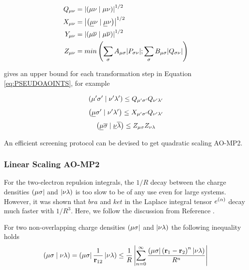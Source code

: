 \begin{equation}
\begin{split}
Q_{\mu\nu} &=  \abs{\left( \mu\nu \mid \mu\nu \right)}^{1/2} \\
X_{\mu\nu} &= \abs{\left( \underline{\mu}\nu \mid \underline{\mu}\nu \right)}^{1/2} \\
Y_{\mu\nu} &= \abs{\left( \mu\overline{\nu} \mid \mu\overline{\nu} \right)}^{1/2} \\
Z_{\mu\nu} &= min\left( \sum_{\sigma} A_{\mu\sigma} \abs{P_{\sigma\nu}}; \sum_{\sigma} B_{\mu \sigma} \abs{Q_{\sigma\nu}} \right)
\end{split}
\end{equation} 

\noindent gives an upper bound for each transformation step in Equation \ref{eq:PSEUDOAOINTS}, for example 

\begin{equation}
\left( \mu'\sigma' \mid \nu'\lambda' \right) \leq Q_{\mu'\sigma'}Q_{\nu'\lambda'}
\end{equation}
\begin{equation}
\left( \underline{\mu}\sigma' \mid \nu'\lambda' \right) \leq X_{\mu'\sigma'}Q_{\nu'\lambda'}
\end{equation}
\begin{equation}
\left( \underline{\mu} \overline{\sigma} \mid \underline{\nu}\overline{\lambda} \right) \leq Z_{\mu\sigma} Z_{\nu\lambda}
\end{equation}

\noindent An efficient screening protocol can be devised \cite{Has1993} to get quadratic scaling AO-MP2.

\subsubsection{Linear Scaling AO-MP2}

For the two-electron repulsion integrals, the $1/R$ decay between the charge densities $\left( \mu\sigma \right\rvert$ and $\left\lvert \nu\lambda \right)$ is too slow to be of any use even for large systems. However, it was shown \cite{Aya1999} that $bra$ and $ket$ in the Laplace integral tensor $e^{(\alpha)}$ decay much faster with $1/R^3$. Here, we follow the discussion from Reference \cite{Lam2005a}. 

For two non-overlapping charge densities $\left( \mu\sigma \right\rvert$ and $\left\lvert \nu\lambda \right)$ the following inequality holds
\begin{equation}
\left( \mu\sigma \mid \nu\lambda \right) = \left( \mu\sigma \right\rvert\frac{1}{\mathbf{r}_{12}}\left\lvert \nu\lambda \right) \leq \frac{1}{R} \left\lvert \sum_{n=0}^{\infty} \frac{\left( \mu\sigma \right\rvert \left( \mathbf{r}_1 - \mathbf{r}_2 \right)^n \left\lvert \nu\lambda \right)}{R^n} \right\rvert
\label{eq:MBIESCREEN}
\end{equation}

